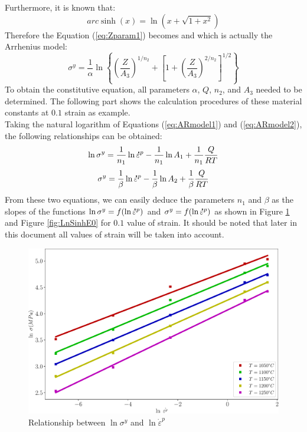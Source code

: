 \documentclass[twoside,english,1p,final,sort&compress]{elsarticle}
\theoremstyle{plain}
\newcommand{\mdot}[1]{\accentset{\mbox{\bfseries .}}{#1}}
\begin{document}
Furthermore, it is known that:
\begin{equation}
arc\sinh(x) = \ln\left(x + \sqrt{1+x^2}\right)
\end{equation}
Therefore the Equation (\ref{eq:Zparam1}) becomes and which is actually the Arrhenius model: 
\begin{equation}
\sigma^y = \frac{1}{\alpha}\ln\left\{\left(\frac{Z}{A_3}\right)^{1/n_2} + \left[1 + \left(\frac{Z}{A_3}\right)^{2/n_2}\right]^{1/2}\right\}
\end{equation}
To obtain the constitutive equation, all parameters $\alpha$, $Q$, $n_2$, and $A_3$ needed to be determined. The following part shows the calculation procedures of these material constants at $0.1$ strain as example.\\
Taking the natural logarithm of Equations (\ref{eq:ARmodel1}) and (\ref{eq:ARmodel2}), the following relationships can be obtained: 
\begin{equation}
\ln \sigma^y = \frac{1}{n_1}\ln \mdot{\varepsilon}^p -\frac{1}{n_1}\ln A_1 +  \frac{1}{n_1}\frac{Q}{RT}
\end{equation}
\begin{equation}
\sigma^y = \frac{1}{\beta}\ln \mdot{\varepsilon}^p - \frac{1}{\beta}\ln A_2 + \frac{1}{\beta}\frac{Q}{RT} 
\end{equation}
From these two equations, we can easily deduce the parameters $n_1$ and $\beta$ as the slopes of the functions $\ln\sigma^y = f(\ln\mdot{\varepsilon}^p)$  and $\sigma^y = f(\ln\mdot{\varepsilon}^p)$ as shown in Figure \ref{fig:LnAlp} and Figure \ref{fig:LnSinhE0} for $0.1$ value of strain. It should be noted that later in this document all values of strain will be taken into account.
\begin{figure}[!ht]
\centering
\includegraphics[width=0.9\columnwidth]{newFigures/LnAlp}
\caption{Relationship between $\ln \sigma^y$ and $\ln \dot{\varepsilon}^p$}
\label{fig:LnAlp}
\end{figure}
\end{document}
